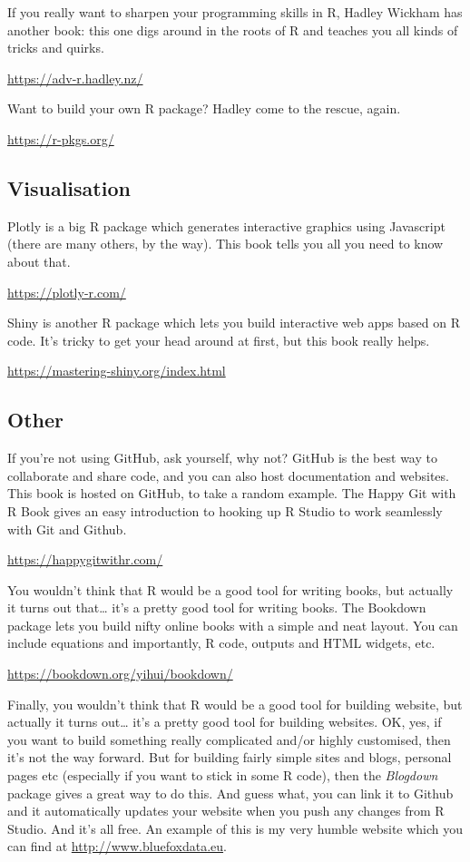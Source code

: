 \documentclass[
]{book}
\begin{document}
If you really want to sharpen your programming skills in R, Hadley Wickham has another book: this one digs around in the roots of R and teaches you all kinds of tricks and quirks.

\url{https://adv-r.hadley.nz/}

Want to build your own R package? Hadley come to the rescue, again.

\url{https://r-pkgs.org/}

\hypertarget{visualisation}{%
\subsection{Visualisation}\label{visualisation}}

Plotly is a big R package which generates interactive graphics using Javascript (there are many others, by the way). This book tells you all you need to know about that.

\url{https://plotly-r.com/}

Shiny is another R package which lets you build interactive web apps based on R code. It's tricky to get your head around at first, but this book really helps.

\url{https://mastering-shiny.org/index.html}

\hypertarget{other}{%
\subsection{Other}\label{other}}

If you're not using GitHub, ask yourself, why not? GitHub is the best way to collaborate and share code, and you can also host documentation and websites. This book is hosted on GitHub, to take a random example. The Happy Git with R Book gives an easy introduction to hooking up R Studio to work seamlessly with Git and Github.

\url{https://happygitwithr.com/}

You wouldn't think that R would be a good tool for writing books, but actually it turns out that\ldots{} it's a pretty good tool for writing books. The Bookdown package lets you build nifty online books with a simple and neat layout. You can include equations and importantly, R code, outputs and HTML widgets, etc.

\url{https://bookdown.org/yihui/bookdown/}

Finally, you wouldn't think that R would be a good tool for building website, but actually it turns out\ldots{} it's a pretty good tool for building websites. OK, yes, if you want to build something really complicated and/or highly customised, then it's not the way forward. But for building fairly simple sites and blogs, personal pages etc (especially if you want to stick in some R code), then the \emph{Blogdown} package gives a great way to do this. And guess what, you can link it to Github and it automatically updates your website when you push any changes from R Studio. And it's all free. An example of this is my very humble website which you can find at \url{http://www.bluefoxdata.eu}.
\end{document}
